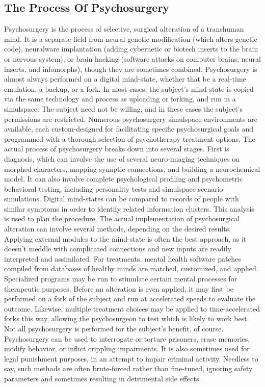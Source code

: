 \subsection{The Process Of Psychosurgery}
Psychosurgery is the process of selective, surgical alteration
of a transhuman mind. It is a separate field from
neural genetic modification (which alters genetic code),
neuralware implantation (adding cybernetic or biotech
inserts to the brain or nervous system), or brain hacking
(software attacks on computer brains, neural inserts, and
infomorphs), though they are sometimes combined.
Psychosurgery is almost always performed on a
digital mind-state, whether that be a real-time emulation,
a backup, or a fork. In most cases, the subject’s
mind-state is copied via the same technology and process
as uploading or forking, and run in a simulspace.
The subject need not be willing, and in these cases
the subject’s permissions are restricted. Numerous
psychosurgery simulspace environments are available,
each custom-designed for facilitating specific psychosurgical
goals and programmed with a thorough
selection of psychotherapy treatment options.
The actual process of psychosurgery breaks down
into several stages. First is diagnosis, which can
involve the use of several neuro-imaging techniques
on morphed characters, mapping synaptic connections,
and building a neurochemical model. It can
also involve complete psychological profiling and
psychometric behavioral testing, including personality
tests and simulspace scenario simulations. Digital
mind-states can be compared to records of people
with similar symptoms in order to identify related
information clusters. This analysis is used to plan
the procedure.
The actual implementation of psychosurgical alteration
can involve several methods, depending on
the desired results. Applying external modules to the
mind-state is often the best approach, as it doesn’t
meddle with complicated connections and new inputs
are readily interpreted and assimilated. For treatments,
mental health software patches compiled from
databases of healthy minds are matched, customized,
and applied. Specialized programs may be run to
stimulate certain mental processes for therapeutic
purposes. Before an alteration is even applied, it may
first be performed on a fork of the subject and run at
accelerated speeds to evaluate the outcome. Likewise,
multiple treatment choices may be applied to time-accelerated
forks this way, allowing the psychosurgeon
to test which is likely to work best.
Not all psychosurgery is performed for the subject’s
benefit, of course. Psychosurgery can be used to interrogate
or torture prisoners, erase memories, modify
behavior, or inflict crippling impairments. It is also
sometimes used for legal punishment purposes, in
an attempt to impair criminal activity. Needless to
say, such methods are often brute-forced rather than
fine-tuned, ignoring safety parameters and sometimes
resulting in detrimental side effects.


